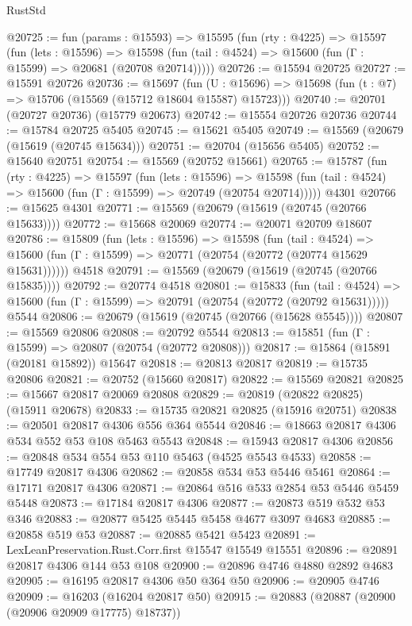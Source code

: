 \begin{lexlean}{RustStd}
\begin{coremodule}
@20725 := fun (params : @15593) =>
  @15595
    (fun (rty : @4225) =>
    @15597
      (fun (lets : @15596) =>
      @15598 (fun (tail : @4524) => @15600 (fun (Γ : @15599) => @20681 (@20708 @20714)))))
@20726 := @15594 @20725
@20727 := @15591 @20726
@20736 := @15697
    (fun (U : @15696) => @15698 (fun (t : @7) => @15706 (@15569 (@15712 @18604 @15587) @15723)))
@20740 := @20701 (@20727 @20736) (@15779 @20673)
@20742 := @15554 @20726 @20736
@20744 := @15784 @20725 @5405
@20745 := @15621 @5405
@20749 := @15569 (@20679 (@15619 (@20745 @15634)))
@20751 := @20704 (@15656 @5405)
@20752 := @15640 @20751
@20754 := @15569 (@20752 @15661)
@20765 := @15787
    (fun (rty : @4225) =>
    @15597
      (fun (lets : @15596) =>
      @15598 (fun (tail : @4524) => @15600 (fun (Γ : @15599) => @20749 (@20754 @20714)))))
    @4301
@20766 := @15625 @4301
@20771 := @15569 (@20679 (@15619 (@20745 (@20766 @15633))))
@20772 := @15668 @20069
@20774 := @20071 @20709 @18607
@20786 := @15809
    (fun (lets : @15596) =>
    @15598
      (fun (tail : @4524) =>
      @15600 (fun (Γ : @15599) => @20771 (@20754 (@20772 (@20774 @15629 @15631))))))
    @4518
@20791 := @15569 (@20679 (@15619 (@20745 (@20766 @15835))))
@20792 := @20774 @4518
@20801 := @15833
    (fun (tail : @4524) => @15600 (fun (Γ : @15599) => @20791 (@20754 (@20772 (@20792 @15631)))))
    @5544
@20806 := @20679 (@15619 (@20745 (@20766 (@15628 @5545))))
@20807 := @15569 @20806
@20808 := @20792 @5544
@20813 := @15851 (fun (Γ : @15599) => @20807 (@20754 (@20772 @20808)))
@20817 := @15864 (@15891 (@20181 @15892)) @15647
@20818 := @20813 @20817
@20819 := @15735 @20806
@20821 := @20752 (@15660 @20817)
@20822 := @15569 @20821
@20825 := @15667 @20817 @20069 @20808
@20829 := @20819 (@20822 @20825) (@15911 @20678)
@20833 := @15735 @20821 @20825 (@15916 @20751)
@20838 := @20501 @20817 @4306 @556 @364 @5544
@20846 := @18663 @20817 @4306 @534 @552 @53 @108 @5463 @5543
@20848 := @15943 @20817 @4306
@20856 := @20848 @534 @554 @53 @110 @5463 (@4525 @5543 @4533)
@20858 := @17749 @20817 @4306
@20862 := @20858 @534 @53 @5446 @5461
@20864 := @17171 @20817 @4306
@20871 := @20864 @516 @533 @2854 @53 @5446 @5459 @5448
@20873 := @17184 @20817 @4306
@20877 := @20873 @519 @532 @53 @346
@20883 := @20877 @5425 @5445 @5458 @4677 @3097 @4683
@20885 := @20858 @519 @53
@20887 := @20885 @5421 @5423
@20891 := LexLeanPreservation.Rust.Corr.first @15547 @15549 @15551
@20896 := @20891 @20817 @4306 @144 @53 @108
@20900 := @20896 @4746 @4880 @2892 @4683
@20905 := @16195 @20817 @4306 @50 @364 @50
@20906 := @20905 @4746
@20909 := @16203 (@16204 @20817 @50)
@20915 := @20883 (@20887 (@20900 (@20906 @20909 @17775) @18737))

\end{coremodule}
\end{lexlean}

